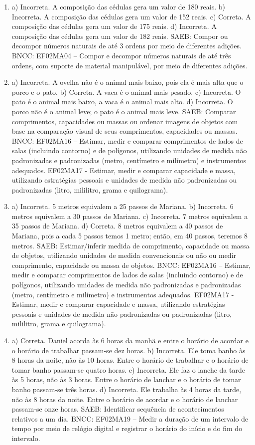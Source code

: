 \begin{enumerate}
\item
a) Incorreta. A composição das cédulas gera um valor de 180 reais.
b) Incorreta. A composição das cédulas gera um valor de 152 reais.
c) Correta. A composição das cédulas gera um valor de 175 reais.
d) Incorreta. A composição das cédulas gera um valor de 182 reais.
SAEB: Compor ou decompor números naturais de até 3 ordens por
meio de diferentes adições.
BNCC: EF02MA04 -- Compor e decompor números naturais de até três ordens,
com suporte de material manipulável, por meio de diferentes adições.

\item
a) Incorreta. A ovelha não é o animal mais baixo, pois ela é mais alta
que o porco e o pato.
b) Correta. A vaca é o animal mais pesado.
c) Incorreta. O pato é o animal mais baixo, a vaca é o animal mais alto.
d) Incorreta. O porco não é o animal leve; o pato é o animal mais leve.
SAEB: Comparar comprimentos, capacidades ou massas ou ordenar
imagens de objetos com base na comparação visual de seus comprimentos,
capacidades ou massas.
BNCC: EF02MA16 -- Estimar, medir e comparar comprimentos de lados de
salas (incluindo contorno) e de polígonos, utilizando unidades de medida
não padronizadas e padronizadas (metro, centímetro e milímetro) e
instrumentos adequados. EF02MA17 - Estimar, medir e comparar capacidade
e massa, utilizando estratégias pessoais e unidades de medida não
padronizadas ou padronizadas (litro, mililitro, grama e quilograma).

\item
a) Incorreta. 5 metros equivalem a 25 passos de Mariana.
b) Incorreta. 6 metros equivalem a 30 passos de Mariana.
c) Incorreta. 7 metros equivalem a 35 passos de Mariana.
d) Correta. 8 metros equivalem a 40 passos de Mariana, pois a cada 5 passos temos 1 metro; então, em 40 passos, teremos 8 metros.
SAEB: Estimar/inferir medida de comprimento, capacidade ou massa
de objetos, utilizando unidades de medida convencionais ou não ou medir
comprimento, capacidade ou massa de objetos.
BNCC: EF02MA16 -- Estimar, medir e comparar comprimentos de lados de
salas (incluindo contorno) e de polígonos, utilizando unidades de medida
não padronizadas e padronizadas (metro, centímetro e milímetro) e
instrumentos adequados. EF02MA17 - Estimar, medir e comparar capacidade
e massa, utilizando estratégias pessoais e unidades de medida não
padronizadas ou padronizadas (litro, mililitro, grama e quilograma).

\item
a) Correta. Daniel acorda às 6 horas da manhã e entre o horário de acordar e o horário de trabalhar passam-se dez horas.
b) Incorreta. Ele toma banho às 8 horas da noite, não às 10 horas. Entre o horário de trabalhar e o horário de tomar banho passam-se quatro horas.
c) Incorreta. Ele faz o lanche da tarde às 5 horas, não às 3 horas. Entre o horário de lanchar e o horário de tomar banho passam-se três horas.
d) Incorreta. Ele trabalha às 4 horas da tarde, não às 8 horas da noite. Entre o horário de acordar e o horário de lanchar passam-se onze horas.
SAEB: Identificar sequência de acontecimentos relativos a um dia.
BNCC: EF02MA19 -- Medir a duração de um intervalo de tempo por meio de
relógio digital e registrar o horário do início e do fim do intervalo.


\end{enumerate}
